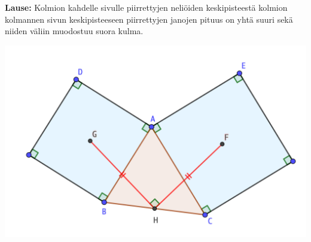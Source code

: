 \documentclass{scrartcl}
\begin{document}
\medskip
\textbf{Lause:} Kolmion kahdelle sivulle piirrettyjen neliöiden keskipisteestä kolmion kolmannen sivun keskipisteeseen piirrettyjen janojen pituus on yhtä suuri sekä niiden väliin muodostuu suora kulma.
\begin{center}
    \includegraphics[scale=0.6]{kolmiotodistus.png}
\end{center}
\end{document}
